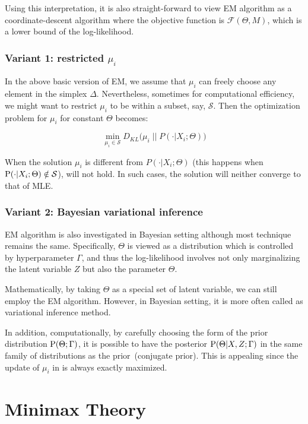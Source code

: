 Using this interpretation, it is also straight-forward to view EM algorithm as a
coordinate-descent algorithm where the objective function is
$\mathcal{F}(\Theta, M)$, which is a lower bound of the log-likelihood.

\subsubsection{Variant 1: restricted $\mu_i$}
In the above basic version of EM, we assume that $\mu_i$ can freely choose any
element in the simplex $\Delta$. Nevertheless, sometimes for computational
efficiency, we might want to restrict $\mu_i$ to be within a subset, say,
$\mathcal{S}$. Then the optimization problem for $\mu_i$ for constant $\Theta$
becomes:

$$\min\limits_{\mu_i \in \mathcal{S}} D_{KL}
\big(\mu_i \; ||\; P(\cdot | X_i; \Theta)\big)$$

When the solution $\mu_i$ is different from $P(\cdot | X_i; \Theta)$ (this
happens when $\P(\cdot | X_i; \Theta) \notin \mathcal{S}$),
 will not hold. In such cases, the solution will neither
converge to that of MLE.

\subsubsection{Variant 2: Bayesian variational inference}

EM algorithm is also investigated in Bayesian setting although most technique
remains the same. Specifically, $\Theta$ is viewed as a distribution which is
controlled by hyperparameter $\Gamma$, and thus the log-likelihood involves not
only marginalizing the latent variable $Z$ but also the parameter $\Theta$.

Mathematically, by taking $\Theta$ as a special set of latent variable, we can
still employ the EM algorithm. However, in Bayesian setting, it is more often
called as variational inference method.

In addition, computationally, by carefully choosing the form of the prior
distribution $\P(\Theta ; \Gamma)$, it is possible to have the posterior
$\P(\Theta | X , Z ; \Gamma)$ in the same family of distributions as the
prior~(conjugate prior). This is appealing since the update of $\mu_i$ in
 is always exactly maximized.

\section{Minimax Theory}

